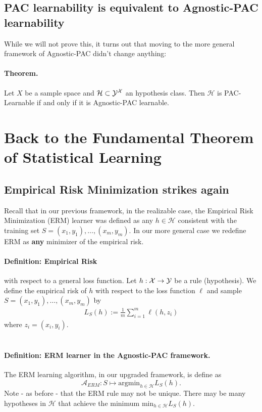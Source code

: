 \documentclass[11pt]{article}
\newcommand{\Ac}{\mathcal{A}}
\newcommand{\Hc}{\mathcal{H}}
\begin{document}
\subsection{PAC learnability is equivalent to Agnostic-PAC learnability}

While we will not prove this, it turns out that moving to the more general
framework of Agnostic-PAC didn't change anything:
\paragraph{Theorem.} Let $X$ be a sample space and $\Hc\subset \Y^\X$ an
hypothesis class. Then $\Hc$ is PAC-Learnable if and only if it is Agnostic-PAC
learnable. 


\section{Back to the Fundamental Theorem of Statistical Learning}


\subsection{Empirical Risk Minimization strikes again}

Recall that in our previous framework, in the realizable case, the Empirical Risk Minimization (ERM) learner was
defined as any $h\in\Hc$ consistent with the training set 
$S=(x_1,y_1),\ldots,(x_m,y_m)$. In our more general case we redefine ERM as 
{\bf any} minimizer of the empirical risk.

\paragraph{Definition: Empirical Risk} with respect to a general loss function.
Let $h:\mathcal{X}\to\mathcal{Y}$ be a rule (hypothesis). We define the empirical risk of $h$ with
respect to the loss function $\ell$ and sample $S=(x_1,y_1),\ldots,(x_m,y_m)$ by 
\begin{eqnarray}
    L_S(h) := \frac{1}{m}\sum_{i=1}^m \ell(h,z_i)
\end{eqnarray}
where $z_i=(x_i,y_i)$.
\\~\\
\paragraph{Definition: ERM learner in the Agnostic-PAC framework.} The ERM learning algorithm, in our upgraded
framework, is define as
\[
\Ac_{ERM} : S \mapsto \text{argmin}_{h\in\Hc} L_S(h).
\]
Note - as before - that the ERM rule may not be unique. There may be many
hypotheses in $\Hc$ that achieve the minimum $ \text{min}_{h\in\Hc} L_S(h)$.
\end{document}
